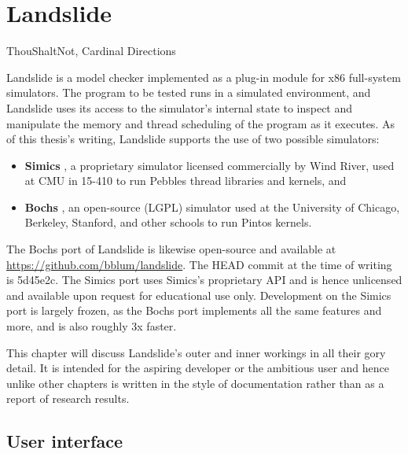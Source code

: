 \chapter{Landslide}
\label{chap:landslide}

{ThouShaltNot, Cardinal Directions}

Landslide is a model checker implemented as a plug-in module for x86 full-system simulators.
The program to be tested runs in a simulated environment,
and Landslide uses its access to the simulator's internal state to inspect and manipulate the memory and thread scheduling of the program as it executes.
As of this thesis's writing, Landslide supports the use of two possible simulators:

\begin{itemize}
	\item {\bf Simics} \cite{simics}, a proprietary simulator licensed commercially by Wind River, used at CMU in 15-410 to run Pebbles thread libraries and kernels, and
	\item {\bf Bochs} \cite{bochs}, an open-source (LGPL) simulator used at the University of Chicago, Berkeley, Stanford, and other schools to run Pintos kernels.
\end{itemize}

The Bochs port of Landslide is likewise open-source and available at \url{https://github.com/bblum/landslide}.
The HEAD commit at the time of writing is 5d45e2c.
The Simics port uses Simics's proprietary API and is hence unlicensed and available upon request for educational use only.
Development on the Simics port is largely frozen,
as the Bochs port implements all the same features and more,
and is also roughly 3x faster.

This chapter will discuss Landslide's outer and inner workings in all their gory detail.
It is intended for the aspiring developer or the ambitious user
and hence unlike other chapters is written in the style of documentation rather than as a report of research results.


\section{User interface}

